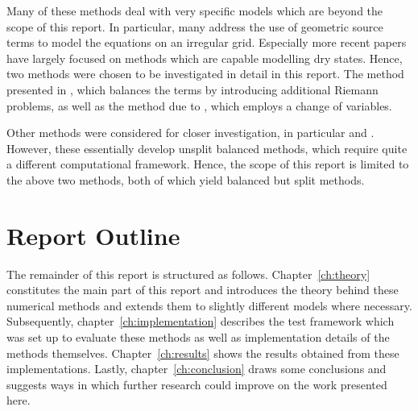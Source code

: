 Many of these methods deal with very specific models which are beyond the scope of this report. In particular, many address the use of geometric source terms to model the equations on an irregular grid. Especially more recent papers have largely focused on methods which are capable modelling dry states. Hence, two methods were chosen to be investigated in detail in this report. The method presented in \citet{leveque1998balancing}, which balances the terms by introducing additional Riemann problems, as well as the method due to \citet{rogers2003mathematical}, which employs a change of variables.

Other methods were considered for closer investigation, in particular \citet{hubbard2000flux} and \citet{chertockwell}. However, these essentially develop unsplit balanced methods, which require quite a different computational framework. Hence, the scope of this report is limited to the above two methods, both of which yield balanced but split methods.

\section{Report Outline}

The remainder of this report is structured as follows. Chapter~\ref{ch:theory} constitutes the main part of this report and introduces the theory behind these numerical methods and extends them to slightly different models where necessary. Subsequently, chapter~\ref{ch:implementation} describes the test framework which was set up to evaluate these methods as well as implementation details of the methods themselves. Chapter~\ref{ch:results} shows the results obtained from these implementations. Lastly, chapter~\ref{ch:conclusion} draws some conclusions and suggests ways in which further research could improve on the work presented here.